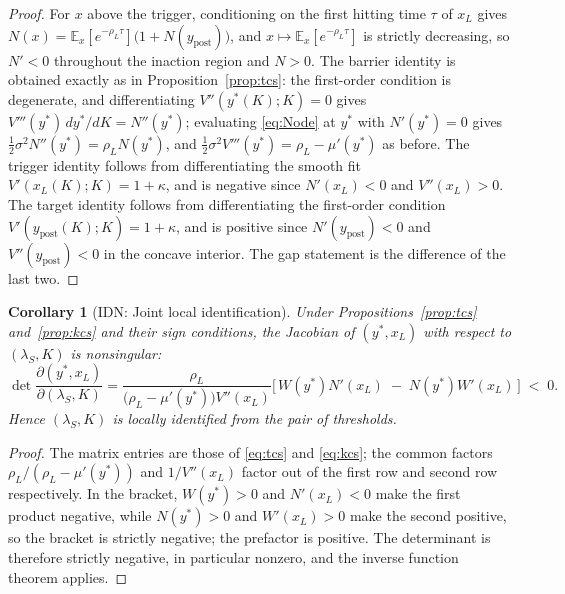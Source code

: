 \documentclass[11pt]{article}
\newtheorem{corollary}{Corollary}
\theoremstyle{remark}
\begin{document}
\begin{proof}
For $x$ above the trigger, conditioning on the first hitting time $\tau$
of $x_L$ gives
$N(x) = \mathbb{E}_x[e^{-\rho_L\tau}]\big(1 + N(y_{\mathrm{post}})\big)$,
and $x \mapsto \mathbb{E}_x[e^{-\rho_L\tau}]$ is strictly decreasing, so
$N' < 0$ throughout the inaction region and $N > 0$. The barrier identity
is obtained exactly as in Proposition~\ref{prop:tcs}: the first-order
condition is degenerate, and differentiating $V''(y^*(K);K)=0$ gives
$V'''(y^*)\,dy^*/dK = N''(y^*)$; evaluating \eqref{eq:Node} at $y^*$ with
$N'(y^*)=0$ gives $\tfrac12\sigma^2 N''(y^*) = \rho_L N(y^*)$, and
$\tfrac12\sigma^2 V'''(y^*) = \rho_L - \mu'(y^*)$ as before. The trigger
identity follows from differentiating the smooth fit
$V'(x_L(K);K) = 1+\kappa$, and is negative since $N'(x_L)<0$ and
$V''(x_L)>0$. The target identity follows from differentiating the
first-order condition $V'(y_{\mathrm{post}}(K);K) = 1+\kappa$, and is
positive since $N'(y_{\mathrm{post}})<0$ and $V''(y_{\mathrm{post}})<0$
in the concave interior. The gap statement is the difference of the last
two.
\end{proof}

\begin{corollary}[IDN: Joint local identification]
\label{cor:idn}
Under Propositions~\ref{prop:tcs} and~\ref{prop:kcs} and their sign
conditions, the Jacobian of $(y^*,x_L)$ with respect to
$(\lambda_S,K)$ is nonsingular:
\begin{equation}
\det \frac{\partial(y^*,x_L)}{\partial(\lambda_S,K)}
= \frac{\rho_L}{\big(\rho_L-\mu'(y^*)\big)V''(x_L)}
  \Big[\,W(y^*)N'(x_L) \;-\; N(y^*)W'(x_L)\,\Big] \;<\; 0 .
\label{eq:jac}
\end{equation}
Hence $(\lambda_S,K)$ is locally identified from the pair of thresholds.
\end{corollary}

\begin{proof}
The matrix entries are those of \eqref{eq:tcs} and \eqref{eq:kcs}; the
common factors $\rho_L/(\rho_L-\mu'(y^*))$ and $1/V''(x_L)$ factor out of
the first row and second row respectively. In the bracket,
$W(y^*)>0$ and $N'(x_L)<0$ make the first product negative, while
$N(y^*)>0$ and $W'(x_L)>0$ make the second positive, so the bracket is
strictly negative; the prefactor is positive. The determinant is therefore
strictly negative, in particular nonzero, and the inverse function theorem
applies.
\end{proof}
\end{document}
